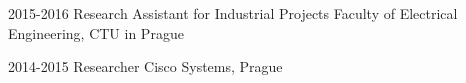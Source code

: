 

\begin{cvskills}

  \cvskill
    {2015-2016} %
    {Research Assistant for Industrial Projects} %
    {Faculty of Electrical Engineering, CTU in Prague} %

  \cvskill
    {2014-2015} %
    {Researcher} %
    {Cisco Systems, Prague} %


\end{cvskills}
